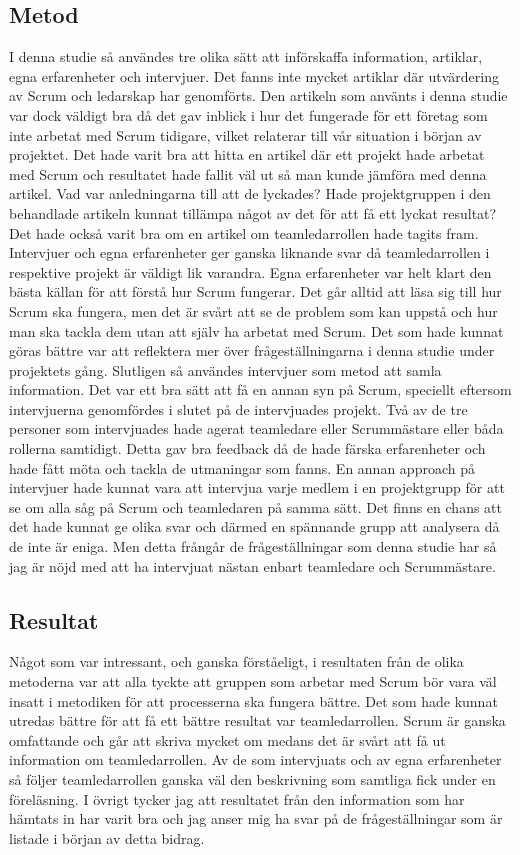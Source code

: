 \subsection{Metod}
I denna studie så användes tre olika sätt att införskaffa information, artiklar, egna erfarenheter och intervjuer. 
Det fanns inte mycket artiklar där utvärdering av Scrum och ledarskap har genomförts. 
Den artikeln som använts i denna studie var dock väldigt bra då det gav inblick i hur det fungerade för ett företag som inte arbetat med Scrum tidigare, vilket relaterar till vår situation i början av projektet. 
Det hade varit bra att hitta en artikel där ett projekt hade arbetat med Scrum och resultatet hade fallit väl ut så man kunde jämföra med denna artikel. 
Vad var anledningarna till att de lyckades? 
Hade projektgruppen i den behandlade artikeln kunnat tillämpa något av det för att få ett lyckat resultat?
Det hade också varit bra om en artikel om teamledarrollen hade tagits fram. Intervjuer och egna erfarenheter ger ganska liknande svar då teamledarrollen i respektive projekt är väldigt lik varandra.
Egna erfarenheter var helt klart den bästa källan för att förstå hur Scrum fungerar. 
Det går alltid att läsa sig till hur Scrum ska fungera, men det är svårt att se de problem som kan uppstå och hur man ska tackla dem utan att själv ha arbetat med Scrum. 
Det som hade kunnat göras bättre var att reflektera mer över frågeställningarna i denna studie under projektets gång. 
Slutligen så användes intervjuer som metod att samla information. 
Det var ett bra sätt att få en annan syn på Scrum, speciellt eftersom intervjuerna genomfördes i slutet på de intervjuades projekt. 
Två av de tre personer som intervjuades hade agerat teamledare eller Scrummästare eller båda rollerna samtidigt. 
Detta gav bra feedback då de hade färska erfarenheter och hade fått möta och tackla de utmaningar som fanns. 
En annan approach på intervjuer hade kunnat vara att intervjua varje medlem i en projektgrupp för att se om alla såg på Scrum och teamledaren på samma sätt. 
Det finns en chans att det hade kunnat ge olika svar och därmed en spännande grupp att analysera då de inte är eniga. 
Men detta frångår de frågeställningar som denna studie har så jag är nöjd med att ha intervjuat nästan enbart teamledare och Scrummästare.

\subsection{Resultat}
Något som var intressant, och ganska förståeligt, i resultaten från de olika metoderna var att alla tyckte att gruppen som arbetar med Scrum bör vara väl insatt i metodiken för att processerna ska fungera bättre.
Det som hade kunnat utredas bättre för att få ett bättre resultat var teamledarrollen. 
Scrum är ganska omfattande och går att skriva mycket om medans det är svårt att få ut information om teamledarrollen. 
Av de som intervjuats och av egna erfarenheter så följer teamledarrollen ganska väl den beskrivning som samtliga fick under en föreläsning. 
I övrigt tycker jag att resultatet från den information som har hämtats in har varit bra och jag anser mig ha svar på de frågeställningar som är listade i början av detta bidrag.

